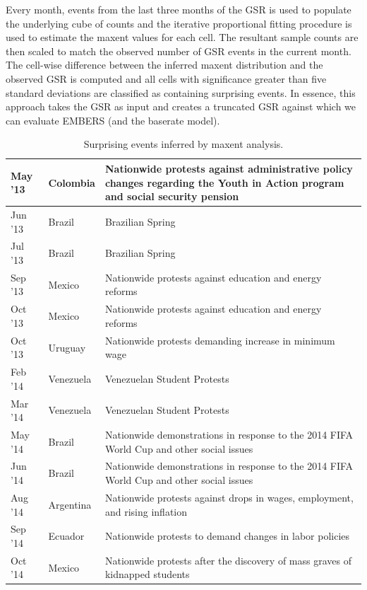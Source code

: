 Every month, events from the last three months of the
GSR is used to populate the underlying cube of counts and the iterative proportional fitting procedure is
used to estimate the maxent values for each cell. The resultant sample counts are then scaled to
match the observed number of GSR events in the current month. The cell-wise difference between the inferred
maxent distribution and the observed GSR is computed and all cells with significance greater than five standard
deviations are classified as containing surprising events. In essence, this approach takes the GSR as input and
creates a truncated GSR against which we can evaluate EMBERS (and the baserate model).

\begin{table}
\caption{Surprising events inferred by maxent analysis.}
\renewcommand{\arraystretch}{1.1}
\vspace{-3mm}
 \centering
 \begin{tabular}{|l|l|m{6cm}|}
 \hline
May '13  &  Colombia	 &  Nationwide protests against administrative policy changes regarding the
Youth in Action program and social security pension \\ \hline
Jun '13  &  Brazil  &  Brazilian Spring \\ \hline
Jul '13  &  Brazil  &  Brazilian Spring \\ \hline
Sep '13  &  Mexico  &  Nationwide protests against education and energy reforms \\ \hline
Oct '13  &  Mexico  &  Nationwide protests against education and energy reforms \\ \hline
Oct '13  &  Uruguay  &  Nationwide protests demanding increase in minimum wage \\ \hline
Feb '14  &  Venezuela	  &  Venezuelan Student Protests \\ \hline
Mar '14  &  Venezuela  &  	Venezuelan Student Protests \\ \hline
May '14  &  Brazil  &  Nationwide demonstrations in response to the 2014 FIFA World Cup and other social issues \\ \hline
Jun '14  &  Brazil  &  Nationwide demonstrations in response to the 2014 FIFA World Cup and other social issues \\ \hline
Aug '14  &  Argentina	  &  Nationwide protests against drops in wages, employment, and rising inflation \\ \hline
Sep '14  &  Ecuador  &  Nationwide protests to demand changes in labor policies \\ \hline
Oct '14  &  Mexico  &  Nationwide protests after the discovery of mass graves of kidnapped students  \\ \hline
\end{tabular}
\vspace{-5mm}
\label{tab:maxentEvents}
\end{table}

